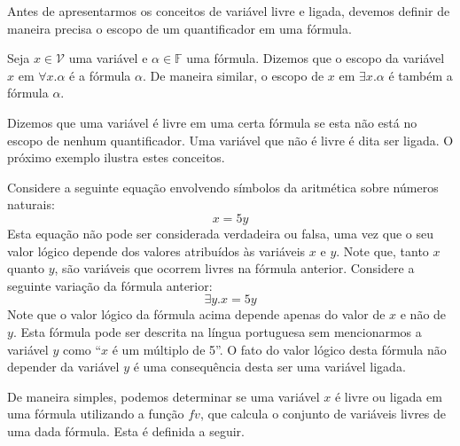 Antes de apresentarmos os conceitos de variável livre e ligada,
devemos definir de maneira precisa o escopo de um quantificador em uma
fórmula.
\begin{Definition}
Seja $x\in\mathcal{V}$ uma variável e $\alpha \in\mathbb{F}$ uma
fórmula. Dizemos que o escopo da variável $x$ em $\forall x. \alpha$ é a
fórmula $\alpha$. De maneira similar, o escopo de $x$ em $\exists x. \alpha$ é
também a fórmula $\alpha$.
\end{Definition}
Dizemos que uma variável é livre em uma certa fórmula se esta não está
no escopo de nenhum quantificador. Uma variável que não é livre é dita
ser ligada. O próximo exemplo ilustra estes conceitos.
\begin{Example}\label{freeboundexample}
  Considere a seguinte equação envolvendo símbolos da aritmética sobre
  números naturais:
  \[
  x = 5y
  \]
  Esta equação não pode ser considerada verdadeira ou falsa, uma vez
  que o seu valor lógico depende dos valores atribuídos às variáveis
  $x$ e $y$. Note que, tanto $x$ quanto $y$, são variáveis que ocorrem
  livres na fórmula anterior. Considere a seguinte variação da fórmula
  anterior:
 \[
 \exists y. x = 5y
 \]
 Note que o valor lógico da fórmula acima depende apenas do valor de
 $x$ e não de $y$. Esta fórmula pode ser descrita na língua portuguesa
 sem mencionarmos a variável $y$ como ``$x$ é um múltiplo de 5''. O
 fato do valor lógico desta fórmula não depender da variável $y$ é uma
 consequência desta ser uma variável ligada.
\end{Example}
De maneira simples, podemos determinar se uma variável $x$ é livre ou
ligada em uma fórmula utilizando a função $fv$, que calcula o
conjunto de variáveis livres de uma dada fórmula. Esta
é definida a seguir.
